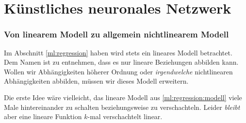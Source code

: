 \section{Künstliches neuronales Netzwerk\label{ml:ann}}

\subsubsection{Von linearem Modell zu allgemein nichtlinearem Modell}

Im Abschnitt \ref{ml:regression} haben wird stets ein lineares Modell betrachtet.
Dem Namen ist zu entnehmen, dass es nur lineare Beziehungen abbilden kann. 
Wollen wir Abhängigkeiten höherer Ordnung oder \emph{irgendwelche} nichtlinearen
Abhängigkeiten abbilden, müssen wir dieses Modell erweitern.

Die erste Idee wäre vielleicht, das lineare Modell aus
\eqref{ml:regression:modell} viele Male hintereinander zu schalten beziehungsweise zu
verschachteln. Leider \emph{bleibt} aber eine lineare Funktion $k$-mal verschachtelt
linear.

